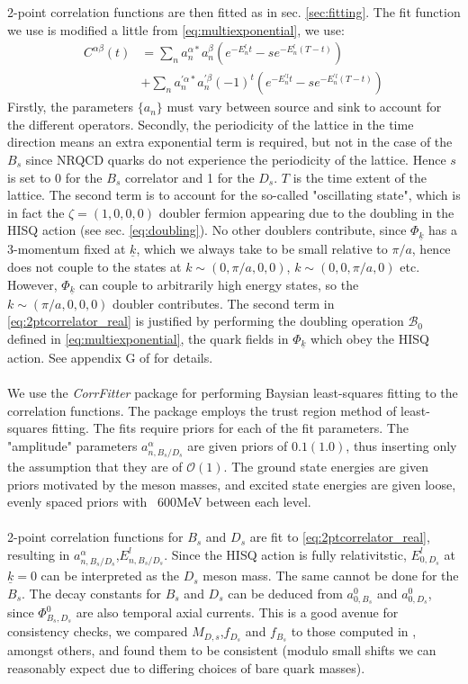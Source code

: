 \documentclass[a4paper,10pt]{article}
\numberwithin{equation}{section}
\begin{document}
2-point correlation functions are then fitted as in sec. \ref{sec:fitting}. The fit function we use is modified a little from \eqref{eq:multiexponential}, we use:
\begin{align}
	\nonumber
	C^{\alpha\beta}(t) &= \sum_{n} a^{\alpha*}_n  a^{\beta}_n ( e^{-E^l_n t} - se^{-E^l_n(T-t)} )\\
	& + \sum_{n} a^{'\alpha*}_n a^{'\beta}_n (-1)^t ( e^{-E^{'l}_n t} - se^{-E^{'l}_n(T-t)} )
	\label{eq:2ptcorrelator_real}
\end{align}
Firstly, the parameters $\{a_n\}$ must vary between source and sink to account for the different operators. Secondly, the periodicity of the lattice in the time direction means an extra exponential term is required, but not in the case of the $B_s$ since NRQCD quarks do not experience the periodicity of the lattice. Hence $s$ is set to 0 for the $B_s$ correlator and 1 for the $D_s$. $T$ is the time extent of the lattice. The second term is to account for the so-called "oscillating state", which is in fact the $\zeta=(1,0,0,0)$ doubler fermion appearing due to the doubling in the HISQ action (see sec. \ref{eq:doubling}). No other doublers contribute, since $\Phi_{\underline{k}}$ has a 3-momentum fixed at $\underline{k}$, which we always take to be small relative to $\pi/a$, hence does not couple to the states at $k\sim(0,\pi/a,0,0)$, $k\sim(0,0,\pi/a,0)$ etc. However, $\Phi_{\underline{k}}$ can couple to arbitrarily high energy states, so the $k\sim(\pi/a,0,0,0)$ doubler contributes. The second term in \eqref{eq:2ptcorrelator_real} is justified by performing the doubling operation $\mathcal{B}_0$ defined in \eqref{eq:multiexponential}, the quark fields in $\Phi_{\underline{k}}$ which obey the HISQ action. See appendix G of \cite{Follana:2006rc} for details.
\\ \\
We use the \textit{CorrFitter} package \cite{CorrFitter} for performing Baysian least-squares fitting to the correlation functions. The package employs the trust region method of least-squares fitting. The fits require priors for each of the fit parameters. The "amplitude" parameters $a_{n,B_s/D_s}^{\alpha}$ are given priors of $0.1(1.0)$, thus inserting only the assumption that they are of $\mathcal{O}(1)$. The ground state energies are given priors motivated by the meson masses, and excited state energies are given loose, evenly spaced priors with ~600MeV between each level.
\\ \\
2-point correlation functions for $B_s$ and $D_s$ are fit to \eqref{eq:2ptcorrelator_real}, resulting in $a^{\alpha}_{n,B_s/D_s}$,$E^l_{n,B_s/D_s}$. Since the HISQ action is fully relativitstic, $E^l_{0,D_s}$ at $\underline{k}=0$ can be interpreted as the $D_s$ meson mass. The same cannot be done for the $B_s$. The decay constants for $B_s$ and $D_s$ can be deduced from $a^0_{0,B_s}$ and $a^0_{0,D_s}$, since $\Phi^0_{B_s,D_s}$ are also temporal axial currents. This is a good avenue for consistency checks, we compared $M_{D,s}$,$f_{D_s}$ and $f_{B_s}$ to those computed in \cite{Colquhoun:2015oha},\cite{Monahan:2017uby} amongst others, and found them to be consistent (modulo small shifts we can reasonably expect due to differing choices of bare quark masses).
\end{document}
